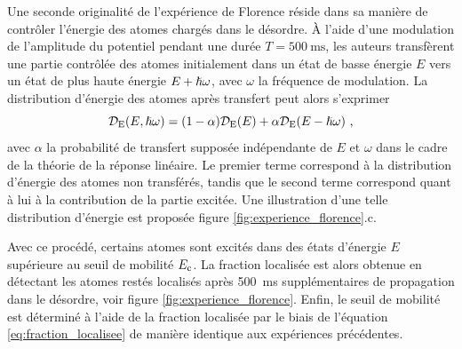 Une seconde originalité de l'expérience de Florence réside dans sa manière de contrôler l'énergie des atomes chargés dans le désordre. À l'aide d'une modulation de l'amplitude du potentiel pendant une durée $T=\SI{500}{\milli\second}$, les auteurs transfèrent une partie contrôlée des atomes initialement dans un état de basse énergie $E$ vers un état de plus haute énergie $E+\hslash\omega$, avec $\omega$ la fréquence de modulation. La distribution d'énergie des atomes après transfert peut alors s'exprimer
\begin{equation}
\mathcal{D}_{\mathrm{E}}(E,\hslash\omega)=(1-\alpha)\mathcal{D}_{\mathrm{E}}(E)+\alpha \mathcal{D}_{\mathrm{E}}(E-\hslash\omega) \text{ ,}
\end{equation}
avec $\alpha$ la probabilité de transfert supposée indépendante de $E$ et $\omega$ dans le cadre de la théorie de la réponse linéaire. Le premier terme correspond à la distribution d'énergie des atomes non transférés, tandis que le second terme correspond quant à lui à la contribution de la partie excitée. Une illustration d'une telle distribution d'énergie est proposée figure \ref{fig:experience_florence}.c.

Avec ce procédé, certains atomes sont excités dans des états d'énergie $E$ supérieure au seuil de mobilité $E_{\mathrm{c}}$. La fraction localisée est alors obtenue en détectant les atomes restés localisés après \SI{500}{\milli\second} supplémentaires de propagation dans le désordre, voir figure \ref{fig:experience_florence}. Enfin, le seuil de mobilité est déterminé à l'aide de la fraction localisée par le biais de l'équation \ref{eq:fraction_localisee} de manière identique aux expériences précédentes.

